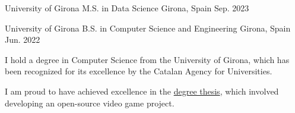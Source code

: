 

\begin{cventries}

  \cventry
    {University of Girona} %
    {M.S. in Data Science} %
    {Girona, Spain} %
    {Sep. 2023} %
    {
      \begin{cvitems} %
      \end{cvitems}
    }

    \cventry
    {University of Girona} %
    {B.S. in Computer Science and Engineering} %
    {Girona, Spain} %
    {Jun. 2022} %
    {
      \begin{cvitems} %
        \item {I hold a degree in Computer Science from the University of Girona,
          which has been recognized for its excellence by the Catalan Agency for Universities.}
        \item {I am proud to have achieved excellence in the
          \href{https://github.com/2WolfGames/Erlang-Legacy}{\color{awesome-emerald}degree thesis},
         which involved developing an open-source video game project.
}
      \end{cvitems}
    }

\end{cventries}
